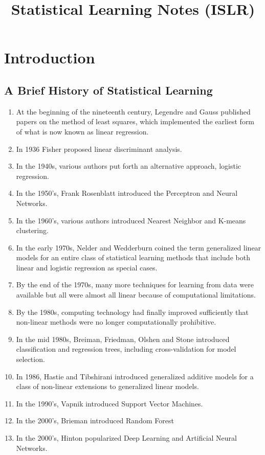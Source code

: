 \documentclass{article}
\title{\vspace{-3cm} Statistical Learning Notes (ISLR)}
\author{}
\date{}
\numberwithin{equation}{section}
\begin{document}
\maketitle
\vspace{-1.5cm}

\tableofcontents
\newpage

\section{Introduction}
\subsection{A Brief History of Statistical Learning}
    \begin{enumerate}
        \item  At the beginning of the nineteenth century, Legendre and Gauss published papers on the method of least squares, which implemented the earliest form of what is now known as linear regression.
        \item In 1936 Fisher proposed linear discriminant analysis.
        \item In the 1940s, various authors put forth an alternative approach, logistic regression.
        \item In the 1950's, Frank Rosenblatt introduced the Perceptron and Neural Networks.
        \item In the 1960's, various authors introduced Nearest Neighbor and K-means clustering.
        \item In the early 1970s, Nelder and Wedderburn coined the term generalized linear models for an entire class of statistical learning methods that include both linear and logistic regression as special cases.
        \item By the end of the 1970s, many more techniques for learning from data were available but all were almost all linear because of computational limitations.
        \item By the 1980s, computing technology had finally improved sufficiently that non-linear methods were no longer computationally prohibitive.
        \item In the mid 1980s, Breiman, Friedman, Olshen and Stone introduced classification and regression trees,  including cross-validation for model selection.
        \item In 1986,  Hastie and Tibshirani introduced generalized additive models for a class of non-linear extensions to generalized linear models.
        \item In the 1990's, Vapnik introduced Support Vector Machines.
        \item In the 2000's, Brieman introduced Random Forest
        \item In the 2000's, Hinton popularized Deep Learning and Artificial Neural Networks.
    \end{enumerate}
    
\end{document}

